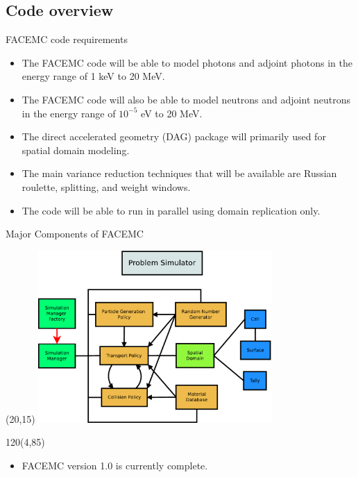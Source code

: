 \documentclass{beamer}
\begin{document}
\subsection{Code overview}
\begin{frame}{FACEMC code requirements}

  \begin{itemize}
    \item The FACEMC code will be able to model photons and adjoint photons
      in the energy range of 1 keV to 20 MeV.
    \item The FACEMC code will also be able to model neutrons and adjoint
      neutrons in the energy range of $10^{-5}$ eV to 20 MeV.
    \item The direct accelerated geometry (DAG) package will primarily used
      for spatial domain modeling.
    \item The main variance reduction techniques that will be available are
      Russian roulette, splitting, and weight windows.
    \item The code will be able to run in parallel using domain replication
      only.
  \end{itemize}

\end{frame}

\begin{frame}{Major Components of FACEMC}
  
  \begin{textblock}{20}(20,15)
    \includegraphics[width=3.5in]{../document/chapters/code_overview/Problem_Simulator.pdf}
  \end{textblock}

  \begin{textblock}{120}(4,85)
    \begin{itemize}
      \item FACEMC version 1.0 is currently complete.
    \end{itemize}
  \end{textblock}

\end{frame}
\end{document}
